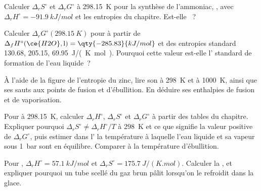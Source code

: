 \begin{exercise}[$\star$]\label{exo:b2:reaction-free-energy:2}
Calculer $\Delta_r S^\circ$ et $\Delta_r G^\circ$ à \qty{298.15}{K} pour la
synthèse de l'ammoniac, , avec $\Delta_r
H^\circ = \qty{-91.9}{kJ/mol}$ et les entropies du chapitre. Est-elle
~?
\end{exercise}

\begin{exercise}[$\star$]\label{exo:b2:reaction-free-energy:3}
Calculer $\Delta_r G^\circ(\qty{298.15}{K})$ pour  à partir de $\Delta_f H^\circ(\ce{H2O}, \text{l}) = \qty{-285.83}{kJ/mol}$
et des entropies standard  130.68,  205.15,
 \qty{69.95}{J/(K.mol)}. Pourquoi cette valeur est-elle l'
standard de formation de l'eau liquide~?
\end{exercise}

\begin{exercise}[$\star$]\label{exo:b2:reaction-free-energy:4}
À l'aide de la figure de l'entropie du zinc, lire son  à
\qty{298}{K} et à \qty{1000}{K}, ainsi que ses sauts aux points de fusion et
d'ébullition. En déduire ses enthalpies de fusion et de vaporisation.
\end{exercise}

\begin{exercise}[$\star\star$]\label{exo:b2:reaction-free-energy:5}
Pour  à \qty{298.15}{K}, calculer $\Delta_r H^\circ$,
$\Delta_r S^\circ$ et $\Delta_r G^\circ$ à partir des tables du chapitre.
Expliquer pourquoi $\Delta_r S^\circ \neq \Delta_r H^\circ/T$ à \qty{298}{K} et ce que
signifie la valeur positive de $\Delta_r G^\circ$, puis estimer dans l' la température à laquelle l'eau liquide et sa vapeur sous
\qty{1}{bar} sont en équilibre. Comparer à la température d'ébullition.
\end{exercise}

\begin{exercise}[$\star\star$]\label{exo:b2:reaction-free-energy:6}
Pour , $\Delta_r H^\circ = \qty{57.1}{kJ/mol}$ et
$\Delta_r S^\circ = \qty{175.7}{J/(K.mol)}$. Calculer la , et expliquer pourquoi un tube scellé du gaz brun  pâlit
lorsqu'on le refroidit dans la glace.
\end{exercise}

